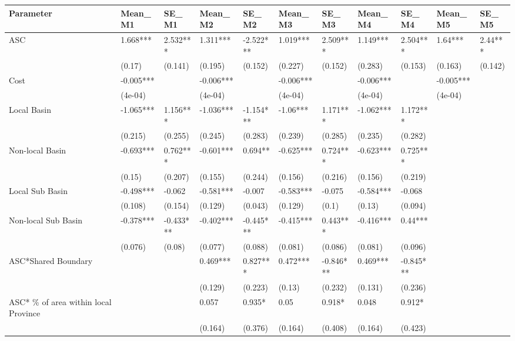 \begin{table}[ht]
\centering
\begin{tabular}{lllllllllll}
  \hline
Parameter & Mean\_M1 & SE\_M1 & Mean\_M2 & SE\_M2 & Mean\_M3 & SE\_M3 & Mean\_M4 & SE\_M4 & Mean\_M5 & SE\_M5 \\ 
  \hline
ASC & 1.668*** & 2.532*** & 1.311*** & -2.522*** & 1.019*** & 2.509*** & 1.149*** & 2.504*** & 1.64*** & 2.44*** \\ 
   & (0.17) & (0.141) & (0.195) & (0.152) & (0.227) & (0.152) & (0.283) & (0.153) & (0.163) & (0.142) \\ 
  Cost & -0.005*** &  & -0.006*** &  & -0.006*** &  & -0.006*** &  & -0.005*** &  \\ 
   & (4e-04) &  & (4e-04) &  & (4e-04) &  & (4e-04) &  & (4e-04) &  \\ 
  Local Basin & -1.065*** & 1.156*** & -1.036*** & -1.154*** & -1.06*** & 1.171*** & -1.062*** & 1.172*** &  &  \\ 
   & (0.215) & (0.255) & (0.245) & (0.283) & (0.239) & (0.285) & (0.235) & (0.282) &  &  \\ 
  Non-local Basin & -0.693*** & 0.762*** & -0.601*** & 0.694** & -0.625*** & 0.724*** & -0.623*** & 0.725*** &  &  \\ 
   & (0.15) & (0.207) & (0.155) & (0.244) & (0.156) & (0.216) & (0.156) & (0.219) &  &  \\ 
  Local Sub Basin & -0.498*** & -0.062 & -0.581*** & -0.007 & -0.583*** & -0.075 & -0.584*** & -0.068 &  &  \\ 
   & (0.108) & (0.154) & (0.129) & (0.043) & (0.129) & (0.1) & (0.13) & (0.094) &  &  \\ 
  Non-local Sub Basin & -0.378*** & -0.433*** & -0.402*** & -0.445*** & -0.415*** & 0.443*** & -0.416*** & 0.44*** &  &  \\ 
   & (0.076) & (0.08) & (0.077) & (0.088) & (0.081) & (0.086) & (0.081) & (0.096) &  &  \\ 
  ASC*Shared Boundary &  &  & 0.469*** & 0.827*** & 0.472*** & -0.846*** & 0.469*** & -0.845*** &  &  \\ 
   &  &  & (0.129) & (0.223) & (0.13) & (0.232) & (0.131) & (0.236) &  &  \\ 
  ASC* \% of area within local Province &  &  & 0.057 & 0.935* & 0.05 & 0.918* & 0.048 & 0.912* &  &  \\ 
   &  &  & (0.164) & (0.376) & (0.164) & (0.408) & (0.164) & (0.423) &  &  \\ 

\end{tabular}
\end{table}

